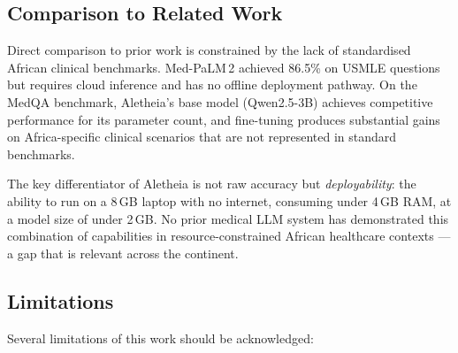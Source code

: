 \documentclass[conference]{IEEEtran}
\begin{document}
\subsection{Comparison to Related Work}

Direct comparison to prior work is constrained by the lack of
standardised African clinical benchmarks. Med-PaLM\,2
\cite{singhal2023medpalm2} achieved 86.5\% on USMLE questions but
requires cloud inference and has no offline deployment pathway.
On the MedQA benchmark, Aletheia's base model (Qwen2.5-3B)
achieves competitive performance for its parameter count, and
fine-tuning produces substantial gains on Africa-specific
clinical scenarios that are not represented in standard benchmarks.

The key differentiator of Aletheia is not raw accuracy but
\textit{deployability}: the ability to run on a 8\,GB laptop
with no internet, consuming under 4\,GB RAM, at a model size of
under 2\,GB. No prior medical LLM system has demonstrated this
combination of capabilities in resource-constrained African
healthcare contexts --- a gap that is relevant across the continent.

\subsection{Limitations}

Several limitations of this work should be acknowledged:
\end{document}
